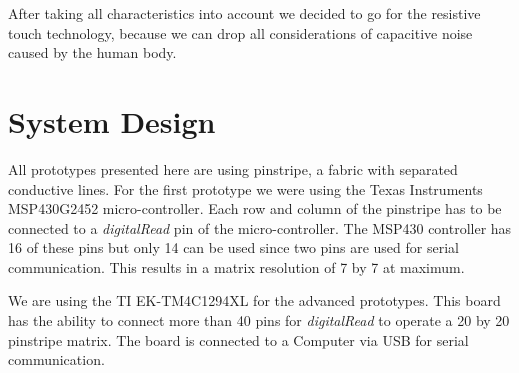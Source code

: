 After taking all characteristics into account we decided to go for the resistive touch technology, because we can drop all considerations of capacitive noise caused by the human body. 

\section{System Design}
All prototypes presented here are using pinstripe, a fabric with separated conductive lines. For the first prototype we were using the Texas Instruments MSP430G2452 micro-controller. Each row and column of the pinstripe has to be connected to a \emph{digitalRead} pin of the micro-controller. The MSP430 controller has 16 of these pins but only 14 can be used since two pins are used for serial communication. This results in a matrix resolution of 7 by 7 at maximum. 
\medskip
{}

We are using the TI EK-TM4C1294XL for the advanced prototypes. This board has the ability to connect more than 40 pins for \emph{digitalRead} to operate a 20 by 20 pinstripe matrix. The board is connected to a Computer via USB for serial communication.\\

